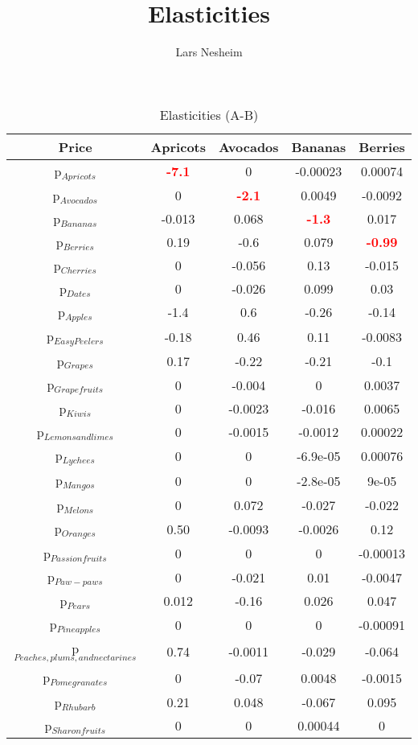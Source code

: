 \documentclass[11pt]{article}
\title{Elasticities}
\author{Lars Nesheim}
\date{}
\begin{document}
\maketitle
\begin{table}[h]
\caption{Elasticities (A-B)}
\label{Table: elasticities 1}
\begin{center}
\begin{tabular}{ccccc}
Price & Apricots & Avocados & Bananas & Berries \\ \hline
p$_{Apricots}$ & \textcolor{red}{\textbf{-7.1}} & 0 & -0.00023 & 0.00074 \\ 
p$_{Avocados}$ & 0 & \textcolor{red}{\textbf{-2.1}} & 0.0049 & -0.0092 \\ 
p$_{Bananas}$ & -0.013 & 0.068 & \textcolor{red}{\textbf{-1.3}} & 0.017 \\ 
p$_{Berries}$ & 0.19 & -0.6 & 0.079 & \textcolor{red}{\textbf{-0.99}} \\ 
p$_{Cherries}$ & 0 & -0.056 & 0.13 & -0.015 \\ 
p$_{Dates}$ & 0 & -0.026 & 0.099 & 0.03 \\ 
p$_{Apples}$ & -1.4 & 0.6 & -0.26 & -0.14 \\ 
p$_{Easy Peelers}$ & -0.18 & 0.46 & 0.11 & -0.0083 \\ 
p$_{Grapes}$ & 0.17 & -0.22 & -0.21 & -0.1 \\ 
p$_{Grapefruits}$ & 0 & -0.004 & 0 & 0.0037 \\ 
p$_{Kiwis}$ & 0 & -0.0023 & -0.016 & 0.0065 \\ 
p$_{Lemons and limes}$ & 0 & -0.0015 & -0.0012 & 0.00022 \\ 
p$_{Lychees}$ & 0 & 0 & -6.9e-05 & 0.00076 \\ 
p$_{Mangos}$ & 0 & 0 & -2.8e-05 & 9e-05 \\ 
p$_{Melons}$ & 0 & 0.072 & -0.027 & -0.022 \\ 
p$_{Oranges}$ & 0.50 & -0.0093 & -0.0026 & 0.12 \\ 
p$_{Passion fruits}$ & 0 & 0 & 0 & -0.00013 \\ 
p$_{Paw-paws}$ & 0 & -0.021 & 0.01 & -0.0047 \\ 
p$_{Pears}$ & 0.012 & -0.16 & 0.026 & 0.047 \\ 
p$_{Pineapples}$ & 0 & 0 & 0 & -0.00091 \\ 
p$_{Peaches, plums, and nectarines}$ & 0.74 & -0.0011 & -0.029 & -0.064 \\ 
p$_{Pomegranates}$ & 0 & -0.07 & 0.0048 & -0.0015 \\ 
p$_{Rhubarb}$ & 0.21 & 0.048 & -0.067 & 0.095 \\ 
p$_{Sharon fruits}$ & 0 & 0 & 0.00044 & 0 \\ 
\end{tabular}
\end{center}
\end{table}
\end{document}
